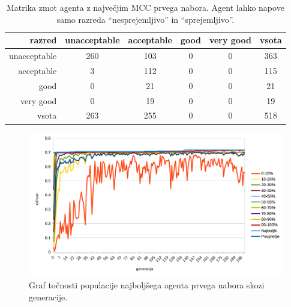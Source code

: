 \begin{table}[H]
    \centering
    \begin{tabular}{||rccccc||}
        \hline
        razred       & unacceptable & acceptable & good & very good & vsota \\ \hline
        unacceptable & 260          & 103        & 0    & 0         & 363   \\ \hline
        acceptable   & 3            & 112        & 0    & 0         & 115   \\ \hline
        good         & 0            & 21         & 0    & 0         & 21    \\ \hline
        very good    & 0            & 19         & 0    & 0         & 19    \\ \hline
        vsota        & 263          & 255        & 0    & 0         & 518   \\ \hline
    \end{tabular}
    \caption{Matrika zmot agenta z največjim MCC prvega nabora. Agent lahko napove samo razreda \enquote{nesprejemljivo} in \enquote{sprejemljivo}.}
    \label{tab:car_mcc_1}
\end{table}

\begin{figure}[H]
    \begin{center}
        \includegraphics[width=13cm]{car/1/acc}
    \end{center}
    \caption{Graf točnosti populacije najboljšega agenta prvega nabora skozi generacije.}
    \label{fig:car_acc_1}
\end{figure}

